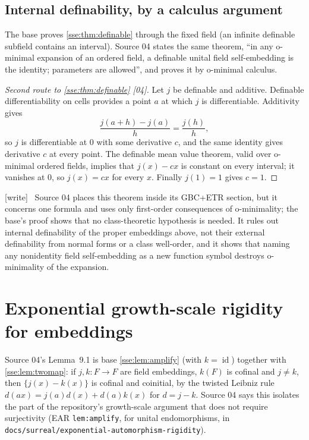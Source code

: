 \documentclass[11pt,a4paper]{article}
\numberwithin{equation}{section}
\theoremstyle{plain}
\theoremstyle{definition}
\theoremstyle{remark}
\newcommand{\id}{\operatorname{id}}
\newcommand{\lbl}[1]{\nolinkurl{#1}}%
\newcommand{\fn}[1]{\nolinkurl{#1}}%
\newcommand{\src}[1]{\textup{\textsf{\small[#1]}}}%
\newcommand{\wtag}{\textup{\textsf{[write]}}}%
\newenvironment{wnote}{\par\smallskip\noindent\wtag\ }{\par\smallskip}
\begin{document}
\subsection{Internal definability, by a calculus argument}
The base proves \cref{sse:thm:definable} through the fixed field (an infinite
definable subfield contains an interval). Source 04 states the same theorem,
``in any o-minimal expansion of an ordered field, a definable unital field
self-embedding is the identity; parameters are allowed'', and proves it by
o-minimal calculus.
\begin{proof}[Second route to \cref{sse:thm:definable} \src{04}]
Let $j$ be definable and additive. Definable differentiability on cells
provides a point $a$ at which $j$ is differentiable. Additivity gives
\[
 \frac{j(a+h)-j(a)}h=\frac{j(h)}h,
\]
so $j$ is differentiable at $0$ with some derivative $c$, and the same
identity gives derivative $c$ at every point. The definable mean value
theorem, valid over o-minimal ordered fields, implies that $j(x)-cx$ is
constant on every interval; it vanishes at $0$, so $j(x)=cx$ for every $x$.
Finally $j(1)=1$ gives $c=1$.
\end{proof}
\begin{wnote}
Source 04 places this theorem inside its GBC+ETR section, but it concerns one
formula and uses only first-order consequences of o-minimality; the base's
proof shows that no class-theoretic hypothesis is needed. It rules out
internal definability of the proper embeddings above, not their external
definability from normal forms or a class well-order, and it shows that
naming any nonidentity field self-embedding as a new function symbol destroys
o-minimality of the expansion.
\end{wnote}

\section{Exponential growth-scale rigidity for embeddings}\label{sse:at:sec:exp}

Source 04's Lemma~9.1 is base \cref{sse:lem:amplify} (with $k=\id$) together
with \cref{sse:lem:twomap}: if $j,k:F\to F$ are field embeddings, $k(F)$ is
cofinal and $j\ne k$, then $\{j(x)-k(x)\}$ is cofinal and coinitial, by the
twisted Leibniz rule $d(ax)=j(a)d(x)+d(a)k(x)$ for $d=j-k$. Source 04 says
this isolates the part of the repository's growth-scale argument that does
not require surjectivity (EAR \lbl{lem:amplify}, for unital endomorphisms, in
\fn{docs/surreal/exponential-automorphism-rigidity}).
\end{document}
